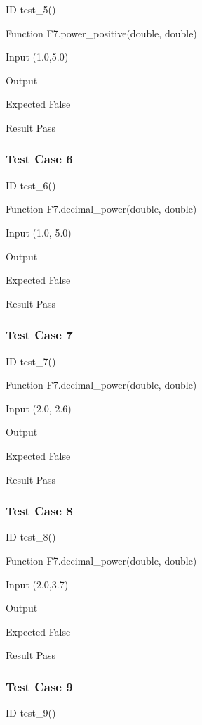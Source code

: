 \documentclass[a4paper,12pt]{article}
\begin{document}
ID  \to   test\_5()

Function \to F7.power\_positive(double, double)

Input \to (1.0,5.0)

Output 

Expected \to False

Result \to Pass



\subsubsection{\textbf{Test Case 6}}

ID \to  test\_6()

Function \to F7.decimal\_power(double, double)

Input \to (1.0,-5.0)

Output 

Expected \to False

Result \to Pass


\subsubsection{\textbf{Test Case 7}}

ID  \to   test\_7()

Function \to F7.decimal\_power(double, double)

Input \to (2.0,-2.6)

Output 

Expected \to False

Result \to Pass



\subsubsection{\textbf{Test Case 8}}

ID  \to   test\_8()

Function \to F7.decimal\_power(double, double)

Input \to (2.0,3.7)

Output 

Expected \to False

Result \to Pass


\subsubsection{\textbf{Test Case 9}}

ID  \to   test\_9()
\end{document}
